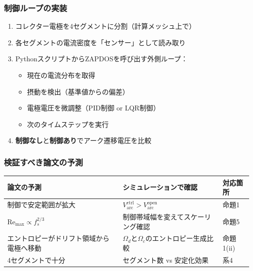 \documentclass[12pt,a4paper]{ltjsarticle}
\begin{document}
\subsubsection{制御ループの実装}

\begin{enumerate}[leftmargin=2em]
  \item コレクター電極を4セグメントに分割（計算メッシュ上で）
  \item 各セグメントの電流密度を「センサー」として読み取り
  \item PythonスクリプトからZAPDOSを呼び出す外側ループ：
    \begin{itemize}
      \item 現在の電流分布を取得
      \item 摂動を検出（基準値からの偏差）
      \item 電極電圧を微調整（PID制御 or LQR制御）
      \item 次のタイムステップを実行
    \end{itemize}
  \item \textbf{制御なし}と\textbf{制御あり}でアーク遷移電圧を比較
\end{enumerate}

\subsubsection{検証すべき論文の予測}

\begin{table}[h]
\centering\sffamily\small
\begin{tabular}{@{}p{4.5cm}p{4cm}p{3cm}@{}}
\toprule
\textbf{論文の予測} & \textbf{シミュレーションで確認} & \textbf{対応箇所} \\
\midrule
制御で安定範囲が拡大 & $V_{\mathrm{arc}}^{\mathrm{ctrl}} > V_{\mathrm{arc}}^{\mathrm{open}}$ & 命題1 \\
$\mathrm{Re}_{\max} \propto f_s^{2/3}$ & 制御帯域幅を変えてスケーリング確認 & 命題5 \\
エントロピーがドリフト領域から電極へ移動 & $\Omega_d$と$\Omega_c$のエントロピー生成比較 & 命題1(ii) \\
4セグメントで十分 & セグメント数 vs 安定化効果 & 系4 \\
\bottomrule
\end{tabular}
\end{table}

\newpage
\end{document}
